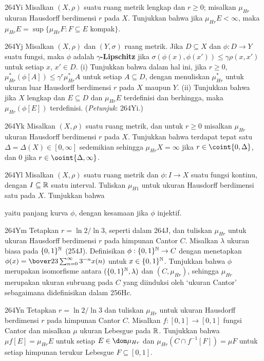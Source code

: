 {\spheader 264Yi Misalkan $(X,\rho)$ suatu ruang metrik lengkap dan $r\ge 0$;
misalkan $\mu_{Hr}$ ukuran Hausdorff berdimensi $r$ pada $X$. Tunjukkan bahwa
jika $\mu_{Hr}E<\infty$, maka
$\mu_{Hr}E=\sup\{\mu_{Hr}F:F\subseteq E$ kompak$\}$.

\spheader 264Yj Misalkan $(X,\rho)$ dan $(Y,\sigma)$ ruang metrik. Jika
$D\subseteq X$ dan $\phi:D\to Y$ suatu fungsi, maka $\phi$ adalah
{\bf $\gamma$-Lipschitz} jika
$\sigma(\phi(x),\phi(x'))\le\gamma\rho(x,x')$ untuk setiap $x$, $x'\in D$.
(i) Tunjukkan bahwa dalam hal ini, jika $r\ge 0$,
$\mu_{Hr}^*(\phi[A])\le\gamma^r\mu_{Hr}^*A$ untuk setiap $A\subseteq D$,
dengan menuliskan $\mu_{Hr}^*$ untuk ukuran luar Hausdorff berdimensi $r$
pada $X$ maupun $Y$. (ii) Tunjukkan bahwa jika $X$ lengkap dan
$E\subseteq D$ dan $\mu_{Hr}E$ terdefinisi dan berhingga, maka
$\mu_{Hr}(\phi[E])$ terdefinisi.
({\it Petunjuk\/}: 264Yi.)

\spheader 264Yk Misalkan $(X,\rho)$ suatu ruang metrik, dan untuk $r\ge 0$
misalkan $\mu_{Hr}$ ukuran Hausdorff berdimensi $r$ pada $X$. Tunjukkan bahwa
terdapat tepat satu $\Delta=\Delta(X)\in[0,\infty]$ sedemikian sehingga
$\mu_{Hr}X=\infty$ jika $r\in\coint{0,\Delta}$, dan $0$ jika
$r\in\ooint{\Delta,\infty}$.

\spheader 264Yl Misalkan $(X,\rho)$ suatu ruang metrik dan $\phi:I\to X$
suatu fungsi kontinu, dengan $I\subseteq\Bbb R$ suatu interval. Tuliskan
$\mu_{H1}$ untuk ukuran Hausdorff berdimensi satu pada $X$. Tunjukkan bahwa


\noindent yaitu panjang kurva $\phi$, dengan kesamaan jika $\phi$ injektif.


\spheader 264Ym Tetapkan $r=\ln 2/\ln 3$, seperti dalam 264J, dan tuliskan
$\mu_{Hr}$ untuk ukuran Hausdorff berdimensi $r$ pada himpunan Cantor $C$.
Misalkan $\lambda$ ukuran biasa pada $\{0,1\}^{\Bbb N}$ (254J).
Definisikan $\phi:\{0,1\}^{\Bbb N}\to C$ dengan menetapkan
$\phi(x)=\bover23\sum_{n=0}^{\infty}3^{-n}x(n)$ untuk
$x\in\{0,1\}^{\Bbb N}$. Tunjukkan bahwa $\phi$ merupakan isomorfisme antara
$(\{0,1\}^{\Bbb N},\lambda)$ dan $(C,\mu_{Hr})$, sehingga $\mu_{Hr}$ merupakan
ukuran subruang pada $C$ yang diinduksi oleh `ukuran Cantor' sebagaimana
didefinisikan dalam 256Hc.

\spheader 264Yn Tetapkan $r=\ln 2/\ln 3$ dan tuliskan $\mu_{Hr}$ untuk ukuran
Hausdorff berdimensi $r$ pada himpunan Cantor $C$. Misalkan
$f:[0,1]\to[0,1]$ fungsi Cantor dan misalkan $\mu$ ukuran Lebesgue pada
$\Bbb R$. Tunjukkan bahwa $\mu f[E]=\mu_{Hr}E$ untuk setiap
$E\in\dom\mu_{Hr}$ dan $\mu_{Hr}(C\cap f^{-1}[F])=\mu F$ untuk setiap
himpunan terukur Lebesgue $F\subseteq[0,1]$.

}
